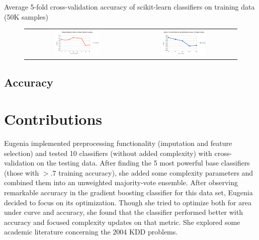 \documentclass{article}
\begin{document}
Average 5-fold cross-validation accuracy of scikit-learn classifiers on training data (50K samples)

% 

\begin{figure}[!h]
\centering
\begin{tabular}{cc}
\includegraphics[width=0.45\textwidth]{nn_features} &
\includegraphics[width=0.45\textwidth]{nn_epochs}
\end{tabular}
\end{figure}


\subsection{Accuracy}


\section{Contributions}

Eugenia implemented preprocessing functionality (imputation and feature selection) and tested 10 classifiers (without added complexity) with cross-validation on the testing data. 
After finding the 5 most powerful base classifiers (those with $> .7$ training accuracy), she added some complexity parameters and combined them into an unweighted majority-vote ensemble. 
After observing remarkable accuracy in the gradient boosting classifier for this data set, Eugenia decided to focus on its optimization.
Though she tried to optimize both for area under curve and accuracy, she found that the classifier performed better with accuracy and focused complexity updates on that metric.
She explored some academic literature concerning the 2004 KDD problems.
\end{document}
